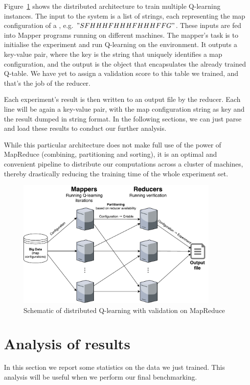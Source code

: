 Figure~\ref{fig:MapReduce} shows the distributed architecture to train multiple Q-learning instances. The input to the system is a list of strings, each representing the map configuration of a , e.g. $"SFHHHFHHHFHHHFFG"$. These inputs are fed into Mapper programs running on different machines. The mapper's task is to initialise the experiment and run Q-learning on the environment. It outputs a key-value pair, where the key is the string that uniquely identifies a map configuration, and the output is the  object that encapsulates the already trained Q-table. We have yet to assign a validation score to this table we trained, and that's the job of the reducer.

Each experiment's result is then written to an output file by the reducer. Each line will be again a key-value pair, with the map configuration string as key and the  result dumped in string format. In the following sections, we can just parse and load these results to conduct our further analysis.

While this particular architecture does not make full use of the power of MapReduce (combining, partitioning and sorting), it is an optimal and convenient pipeline to distribute our computations across a cluster of machines, thereby drastically reducing the training time of the whole experiment set.
\begin{figure}
\centering
\includegraphics[width=10cm]{Figures/MapReduce}
\caption{Schematic of distributed Q-learning with validation on MapReduce}
\label{fig:MapReduce}
\end{figure}

\section{Analysis of results}
\label{sec:analysisresults}
In this section we report some statistics on the data we just trained. This analysis will be useful when we perform our final benchmarking.

